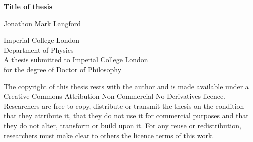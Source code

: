 \begin{titlepage}
    \begin{center}
        \vspace*{2cm}
        
        \huge{\textbf{Title of thesis}}

        \vspace{1.5cm}
        \normalsize
        Jonathon Mark Langford
        
        \vspace{0.5cm}
        Imperial College London\\
        Department of Physics\\

        \vspace{5cm}
        A thesis submitted to Imperial College London\\
        for the degree of Doctor of Philosophy\\
        
    \end{center}
\end{titlepage}

The copyright of this thesis rests with the author and is made available under a Creative Commons Attribution Non-Commercial No Derivatives licence. Researchers are free to copy, distribute or transmit the thesis on the condition that they attribute it, that they do not use it for commercial purposes and that they do not alter, transform or build upon it. For any reuse or redistribution, researchers must make clear to others the licence terms of this work.
